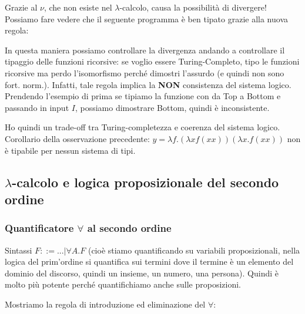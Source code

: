 \documentclass{article}
\begin{document}
\bigskip


\bigskip

Grazie al $\nu$, che non esiste nel $\lambda$-calcolo, causa la possibilità di divergere! Possiamo fare vedere che il seguente programma è ben tipato grazie alla nuova regola:

\bigskip


\bigskip

In questa maniera possiamo controllare la divergenza andando a controllare il tipaggio delle funzioni ricorsive: se voglio essere Turing-Completo, tipo le funzioni ricorsive ma perdo l'isomorfismo perché dimostri l'assurdo (e quindi non sono fort. norm.). Infatti, tale regola implica la \textbf{NON} consistenza del sistema logico. Prendendo l'esempio di prima se tipiamo la funzione con da Top a Bottom e passando in input $I$, possiamo dimostrare Bottom, quindi è inconsistente.

\bigskip

Ho quindi un trade-off tra Turing-completezza e coerenza del sistema logico. Corollario della osservazione precedente: $y = \lambda f.(\lambda x f(xx))(\lambda x.f(xx))$ non è tipabile per nessun sistema di tipi.


\subsection{$\lambda$-calcolo e logica proposizionale del secondo ordine}

\subsubsection{Quantificatore $\forall$ al secondo ordine}
Sintassi $F ::= ...| \forall A.F$ (cioè stiamo quantificando su variabili proposizionali, nella logica del prim'ordine si quantifica sui termini dove il termine è un elemento del dominio del discorso, quindi un insieme, un numero, una persona). Quindi è molto più potente perché quantifichiamo anche sulle proposizioni.

\bigskip

Mostriamo la regola di introduzione ed eliminazione del $\forall$:
\end{document}
